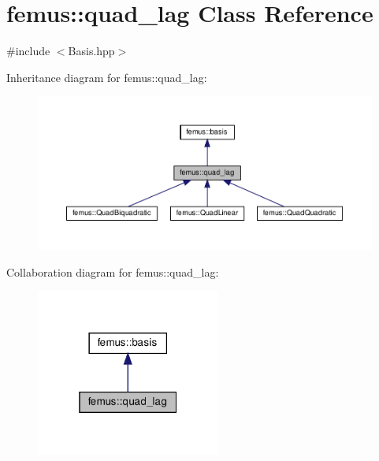 \hypertarget{classfemus_1_1quad__lag}{}\section{femus\+:\+:quad\+\_\+lag Class Reference}
\label{classfemus_1_1quad__lag}


{\ttfamily \#include $<$Basis.\+hpp$>$}



Inheritance diagram for femus\+:\+:quad\+\_\+lag\+:
\nopagebreak
\begin{figure}[H]
\begin{center}
\leavevmode
\includegraphics[width=350pt]{classfemus_1_1quad__lag__inherit__graph}
\end{center}
\end{figure}


Collaboration diagram for femus\+:\+:quad\+\_\+lag\+:
\nopagebreak
\begin{figure}[H]
\begin{center}
\leavevmode
\includegraphics[width=172pt]{classfemus_1_1quad__lag__coll__graph}
\end{center}
\end{figure}
